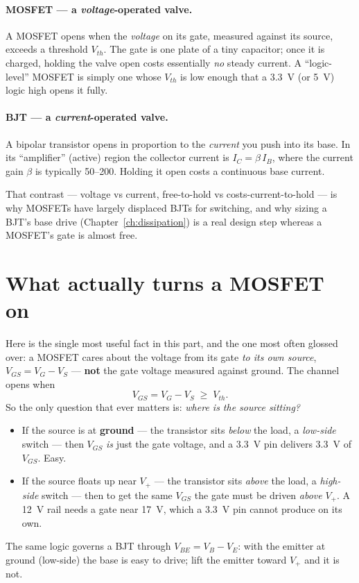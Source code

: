 \documentclass[11pt,a4paper,oneside]{book}
\begin{document}
\paragraph{MOSFET --- a \emph{voltage}-operated valve.} A MOSFET opens when the
\emph{voltage} on its gate, measured against its source, exceeds a threshold $V_{th}$. The
gate is one plate of a tiny capacitor; once it is charged, holding the valve open costs
essentially \emph{no} steady current. A ``logic-level'' MOSFET is simply one whose
$V_{th}$ is low enough that a \qty{3.3}{\volt} (or \qty{5}{\volt}) logic high opens it
fully.

\paragraph{BJT --- a \emph{current}-operated valve.} A bipolar transistor opens in
proportion to the \emph{current} you push into its base. In its ``amplifier'' (active)
region the collector current is $I_C=\beta\,I_B$, where the current gain $\beta$ is
typically \numrange{50}{200}. Holding it open costs a continuous base current.

That contrast --- voltage vs current, free-to-hold vs costs-current-to-hold --- is why
MOSFETs have largely displaced BJTs for switching, and why sizing a BJT's base drive
(Chapter~\ref{ch:dissipation}) is a real design step whereas a MOSFET's gate is almost
free.

\section{What actually turns a MOSFET on}
Here is the single most useful fact in this part, and the one most often glossed over: a
MOSFET cares about the voltage from its gate \emph{to its own source},
$V_{GS}=V_G-V_S$ --- \textbf{not} the gate voltage measured against ground. The channel
opens when
\[ V_{GS} = V_G - V_S \;\ge\; V_{th}. \]
So the only question that ever matters is: \emph{where is the source sitting?}
\begin{itemize}[leftmargin=1.4cm]
  \item If the source is at \textbf{ground} --- the transistor sits \emph{below} the load,
        a \emph{low-side} switch --- then $V_{GS}$ \emph{is} just the gate voltage, and a
        \qty{3.3}{\volt} pin delivers \qty{3.3}{\volt} of $V_{GS}$. Easy.
  \item If the source floats up near $V_+$ --- the transistor sits \emph{above} the load, a
        \emph{high-side} switch --- then to get the same $V_{GS}$ the gate must be driven
        \emph{above} $V_+$. A \qty{12}{\volt} rail needs a gate near \qty{17}{\volt}, which
        a \qty{3.3}{\volt} pin cannot produce on its own.
\end{itemize}
The same logic governs a BJT through $V_{BE}=V_B-V_E$: with the emitter at ground
(low-side) the base is easy to drive; lift the emitter toward $V_+$ and it is not.
\end{document}
